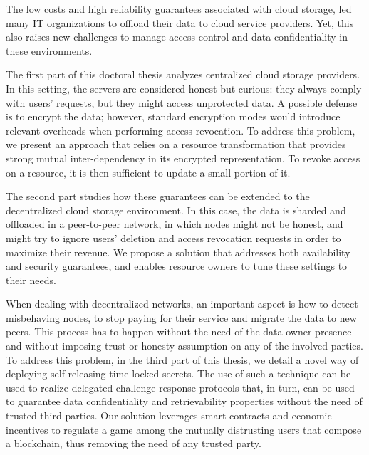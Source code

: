 The low costs and high reliability guarantees associated with cloud storage, led many IT  organizations to offload their data to cloud service providers. Yet, this also raises new challenges to manage access control and data confidentiality in these environments.

The first part of this doctoral thesis analyzes centralized cloud storage providers. In this setting, the servers are considered honest-but-curious: they always comply with users' requests, but they might access unprotected data. A possible defense is to encrypt the data; however, standard encryption modes would introduce relevant overheads when performing access revocation. To address this problem, we present an approach that relies on a resource transformation that provides strong mutual inter-dependency in its encrypted representation. To revoke access on a resource, it is then sufficient to update a small portion of it.

The second part studies how these guarantees can be extended to the decentralized cloud storage environment. In this case, the data is sharded and offloaded in a peer-to-peer network, in which nodes might not be honest, and might try to ignore users' deletion and access revocation requests in order to maximize their revenue. We propose a solution that addresses both availability and security guarantees, and enables resource owners to tune these settings to their needs.

When dealing with decentralized networks, an important aspect is how to detect misbehaving nodes, to stop paying for their service and migrate the data to new peers. This process has to happen without the need of the data owner presence and without imposing trust or honesty assumption on any of the involved parties. To address this problem, in the third part of this thesis, we detail a novel way of deploying self-releasing time-locked secrets. The use of such a technique can be used to realize delegated challenge-response protocols that, in turn, can be used to guarantee data confidentiality and retrievability properties without the need of trusted third parties.
Our solution leverages smart contracts and economic incentives to regulate a game among the mutually distrusting users that compose a blockchain, thus removing the need of any trusted party.


